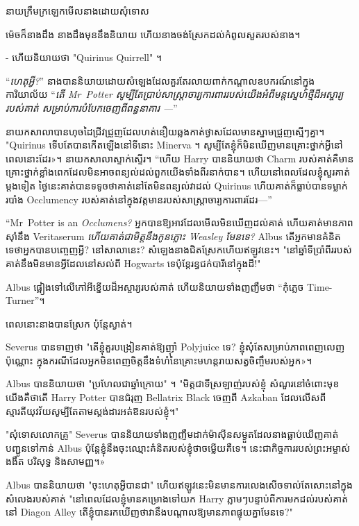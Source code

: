 នាយក្រឹមក្រឡេកមើលនាងដោយសុំទោស

ម៉េចក៏នាងដឹង នាងដឹងមុននឹងនិយាយ ហើយនាងចង់ស្រែកដល់កំពូលសួតរបស់នាង។

- ហើយនិយាយថា "Quirinus Quirrell" ។

“\emph{ហេតុអ្វី?}” នាងបាននិយាយដោយសំឡេងដែលគួរតែរលាយពាក់កណ្តាលឧបករណ៍នៅក្នុងការិយាល័យ “\emph{តើ Mr~Potter សូម្បីតែ\emph{ប្រាប់}សាស្រ្តាចារ្យការពាររបស់យើងអំពីមន្តស្នេហ៍ថ្មីដ៏អស្ចារ្យរបស់គាត់ សម្រាប់​ការ​បំបែក​ចេញពី​ពន្ធនាគារ —}”

នាយកសាលាបានហុចដៃជ្រីវជ្រួញដែលហត់នឿយឆ្លងកាត់ថ្ងាសដែលមានស្នាមជ្រួញស្មើៗគ្នា។ "Quirinus ទើបតែបានកើតឡើងនៅទីនោះ Minerva ។ សូម្បី​តែ​ខ្ញុំ​ក៏​មិន​ឃើញ​មាន​គ្រោះថ្នាក់​អ្វី​នៅ​ពេល​នោះ​ដែរ»។ នាយកសាលាស្ទាក់ស្ទើរ។ “ហើយ Harry បាននិយាយថា Charm របស់គាត់គឺមានគ្រោះថ្នាក់ខ្លាំងពេកដែលមិនអាចពន្យល់ដល់ពួកយើងទាំងពីរនាក់បាន។ ហើយនៅពេលដែលខ្ញុំសួរគាត់ម្តងទៀត ថ្ងៃនេះគាត់បានទទូចថាគាត់នៅតែមិនពន្យល់វាដល់ Quirinus ហើយគាត់ក៏ធ្លាប់បានទម្លាក់របាំង Occlumency របស់គាត់នៅក្នុងវត្តមានរបស់សាស្ត្រាចារ្យការពារដែរ—”

“Mr~Potter is an \emph{Occlumens?} អ្នកបានឱ្យអាវដែលមើលមិនឃើញដល់គាត់ ហើយគាត់មានភាពស៊ាំនឹង Veritaserum \emph{ ហើយគាត់ជាមិត្តនឹងកូនភ្លោះ Weasley មែនទេ?} Albus តើអ្នកមានគំនិតទេថាអ្នកបានបញ្ចេញអ្វី? នៅសាលានេះ? សំឡេង​នាង​ជិត​ស្រែក​ហើយ​ឥឡូវ​នេះ។ "នៅឆ្នាំទីប្រាំពីររបស់គាត់នឹងមិនមានអ្វីដែលនៅសល់ពី Hogwarts ទេប៉ុន្តែរន្ធជក់បារីនៅក្នុងដី!"

Albus ផ្អៀង​ទៅ​លើ​កៅអី​ខ្នើយ​ដ៏​អស្ចារ្យ​របស់​គាត់ ហើយ​និយាយ​ទាំង​ញញឹម​ថា “កុំភ្លេច Time-Turner”។

ពេល​នោះ​នាង​បាន​ស្រែក ប៉ុន្តែ​ស្ងាត់។

Severus បានទាញថា "តើខ្ញុំគួរបង្រៀនគាត់ឱ្យញ៉ាំ Polyjuice ទេ? ខ្ញុំ​សុំ​តែ​សម្រាប់​ភាព​ពេញលេញ​ប៉ុណ្ណោះ ក្នុង​ករណី​ដែល​អ្នក​មិន​ពេញ​ចិត្ត​នឹង​ទំហំ​នៃ​គ្រោះ​មហន្តរាយ​សត្វ​ចិញ្ចឹម​របស់​អ្នក»។

Albus បាននិយាយថា "ប្រហែលជាឆ្នាំក្រោយ" ។ "មិត្តជាទីស្រឡាញ់របស់ខ្ញុំ សំណួរនៅចំពោះមុខយើងគឺថាតើ Harry Potter បានជំរុញ Bellatrix Black ចេញពី Azkaban ដែលលើសពីស្មារតីយុវវ័យសូម្បីតែតាមស្តង់ដារអត់ឱនរបស់ខ្ញុំ។"

"សុំទោសលោកគ្រូ" Severus បាននិយាយទាំងញញឹមដាក់ម៉ាស៊ីនសម្ងួតដែលនាងធ្លាប់ឃើញគាត់បញ្ជូនទៅកាន់ Albus ប៉ុន្តែខ្ញុំនឹងចុះឈ្មោះគំនិតរបស់ខ្ញុំថាចម្លើយគឺទេ។ នេះ​ជា​កិច្ចការ​របស់​ព្រះអម្ចាស់​ងងឹត បរិសុទ្ធ និង​សាមញ្ញ។»

Albus បាននិយាយថា "ចុះហេតុអ្វីបានជា" ហើយឥឡូវនេះមិនមានការលេងសើចទាល់តែសោះនៅក្នុងសំលេងរបស់គាត់ "នៅពេលដែលខ្ញុំមានគម្រោងទៅយក Harry ភ្លាមៗបន្ទាប់ពីការមកដល់របស់គាត់នៅ Diagon Alley តើខ្ញុំបានរកឃើញថាវានឹងបណ្តាលឱ្យមានភាពផ្ទុយគ្នាមែនទេ?"

